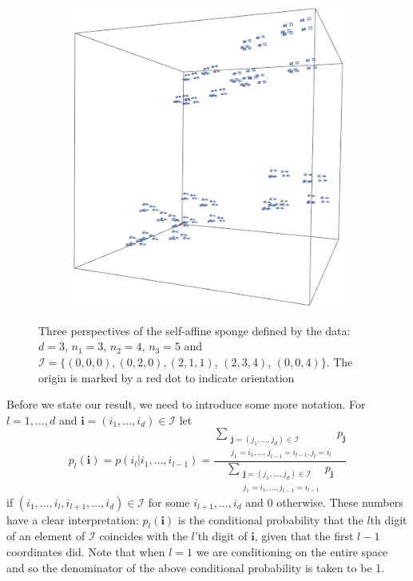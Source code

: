 \begin{figure}[h]
	\begin{subfigure}{0.35\textwidth}
		\centering
		\includegraphics[width=0.85\linewidth]{pics/ch-upper-reg/sponge13.png}
		\label{ch-upper-reg:fig:sub2}
	\end{subfigure}
	\caption{Three perspectives of the self-affine sponge defined by the data: $d=3$,  $n_1=3$, $n_2=4$, $n_3=5$ and  $\mathcal{I} = \{ (0,0,0),(0,2,0),(2,1,1)$, $(2,3,4)$, $(0,0,4) \}$. The origin is marked by a red dot to indicate orientation}
\end{figure}


Before we state our result, we need to introduce some more notation.  For $l=1, \dots, d$ and $\textbf{i}=(i_1, \ldots, i_d)\in \mathcal{I} $  let 
\[
p_l(\mathbf{i})=p (i_l \vert i_1, \ldots , i_{l-1})=\frac{\displaystyle\sum_{\substack{\textbf{j}=\left( j_1, \ldots, j_d\right)\in \mathcal{I} \\ j_1=i_1, \ldots, j_{l-1}=i_{l-1}, j_l=i_l}}p_{\textbf{j}}}{\displaystyle\sum_{\substack{\textbf{j}=\left( j_1, \ldots, j_d\right)\in \mathcal{I} \\ j_1=i_1, \ldots, j_{l-1}=i_{l-1}}}p_{\textbf{j}}}
\]
if $(i_1, \ldots, i_l, i_{l+1},\ldots, i_d) \in \mathcal{I}$ for some $i_{l+1},\ldots, i_d$ and $0$ otherwise.  These numbers have a clear interpretation: $p_l(\mathbf{i})$ is the conditional probability that the $l$th digit of an element of $\mathcal{I}$  coincides with the $l$'th digit of $\mathbf{i}$, given that the first $l-1$ coordinates did.  Note that when $l=1$ we are conditioning on the entire space and so the denominator of the above conditional probability is taken to be 1.


